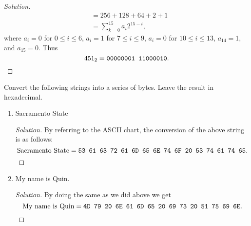 \documentclass[12pt]{article}
\theoremstyle{definition}
\newenvironment{solution}
{\renewcommand\qedsymbol{$\blacksquare$}\begin{proof}[Solution]}
{\end{proof}}
\begin{document}
\begin{enumerate}
\begin{solution}
\begin{equation*}
\begin{split}
                            &=256+128+64+2+1 \\
                            &=\sum_{k=0}^{15}a_i2^{15-i},
                        \end{split}
                    \end{equation*}
                where $a_i=0$ for $0\leq i\leq 6$, $a_i=1$ for $7\leq
                i\leq 9$, $a_i=0$ for $10\leq i\leq 13$, $a_{14}=1$, and
                $a_{15}=0$. Thus 
                    \begin{equation*}
                        451_2=\text{\texttt{00000001 11000010}}.
                    \end{equation*}
            \end{solution}
    \end{enumerate}\newpage
    Convert the following strings into a series of bytes. Leave the result in
    hexadecimal.
    \begin{enumerate}
        \item Sacramento State
            \begin{solution}
                By referring to the ASCII chart, the conversion of the above
                string is as follows:
                    \begin{equation*}
                        \text{Sacramento State}=\text{\texttt{53 61 63 72 61 6D
                        65 6E 74 6F 20 53 74 61 74 65}}.
                    \end{equation*}
            \end{solution}
        \item My name is Quin.
            \begin{solution}
                By doing the same as we did above we get 
                    \begin{equation*}
                        \text{My name is Quin}=\text{\texttt{4D 79 20 6E 61 6D
                        65 20 69 73 20 51 75 69 6E}}.
                    \end{equation*}
            \end{solution}
    \end{enumerate}
\end{document}
